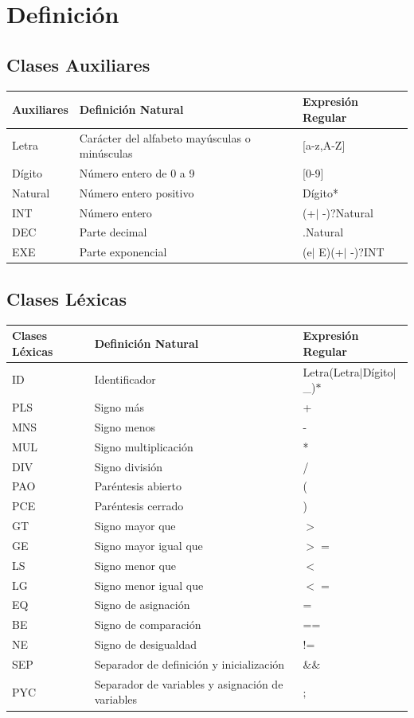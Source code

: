 \documentclass{article}
\begin{document}
\section{Definición}
\subsection{Clases Auxiliares}
\begin{center}
    \begin{tabular}{ | p{2cm} | p{5cm} | p{4cm} |}
    \hline
    Auxiliares & Definición Natural & Expresión Regular \\ \hline
    Letra & Carácter del alfabeto mayúsculas o minúsculas  & [a-z,A-Z]\\ \hline
    Dígito & Número entero de 0 a 9 & [0-9] \\ \hline
    Natural & Número entero positivo & Dígito* \\ \hline
    INT & Número entero & (+$\mid$ -)?Natural \\ \hline
    DEC & Parte decimal &  .Natural \\ \hline
    EXE & Parte exponencial  & (e$\mid$ E)(+$\mid$ -)?INT  \\ \hline
    \end{tabular}
\end{center}
\subsection{Clases Léxicas}
\begin{center}
    \begin{tabular}{ | p{2cm} | p{5cm} | p{4cm} |}
    \hline
     Clases Léxicas & Definición Natural & Expresión Regular \\ \hline
     ID & Identificador & Letra(Letra$\mid$Dígito$\mid$\_)$*$ \\ \hline
     PLS & Signo más & + \\ \hline
     MNS & Signo menos & - \\ \hline
     MUL & Signo multiplicación & * \\ \hline
     DIV & Signo división & / \\ \hline
     PAO & Paréntesis abierto & ( \\ \hline
      PCE & Paréntesis cerrado & ) \\ \hline
      GT & Signo mayor que & $>$\\ \hline
      GE & Signo mayor igual que & $>=$ \\ \hline
      LS & Signo menor que & $<$\\ \hline
      LG & Signo menor igual que & $<=$ \\ \hline
      EQ & Signo de asignación & = \\ \hline
      BE & Signo de comparación & == \\ \hline
      NE & Signo de desigualdad & !=  \\ \hline
			SEP & Separador de definición y inicialización & \&\& \\ \hline
			PYC & Separador de variables y asignación de variables & $;$ \\ \hline
    \end{tabular}
\end{center}
\end{document}
